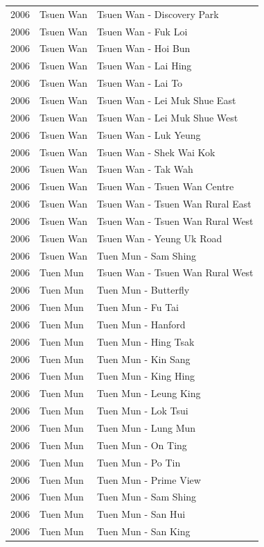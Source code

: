 \begin{longtable}{p{1.2cm}p{3cm}p{7cm}}
2006 & Tsuen Wan & Tsuen Wan - Discovery Park \\
2006 & Tsuen Wan & Tsuen Wan - Fuk Loi \\
2006 & Tsuen Wan & Tsuen Wan - Hoi Bun \\
2006 & Tsuen Wan & Tsuen Wan - Lai Hing \\
2006 & Tsuen Wan & Tsuen Wan - Lai To \\
2006 & Tsuen Wan & Tsuen Wan - Lei Muk Shue East \\
2006 & Tsuen Wan & Tsuen Wan - Lei Muk Shue West \\
2006 & Tsuen Wan & Tsuen Wan - Luk Yeung \\
2006 & Tsuen Wan & Tsuen Wan - Shek Wai Kok \\
2006 & Tsuen Wan & Tsuen Wan - Tak Wah \\
2006 & Tsuen Wan & Tsuen Wan - Tsuen Wan Centre \\
2006 & Tsuen Wan & Tsuen Wan - Tsuen Wan Rural East \\
2006 & Tsuen Wan & Tsuen Wan - Tsuen Wan Rural West \\
2006 & Tsuen Wan & Tsuen Wan - Yeung Uk Road \\
2006 & Tsuen Wan & Tuen Mun - Sam Shing \\
2006 & Tuen Mun & Tsuen Wan - Tsuen Wan Rural West \\
2006 & Tuen Mun & Tuen Mun - Butterfly \\
2006 & Tuen Mun & Tuen Mun - Fu Tai \\
2006 & Tuen Mun & Tuen Mun - Hanford \\
2006 & Tuen Mun & Tuen Mun - Hing Tsak \\
2006 & Tuen Mun & Tuen Mun - Kin Sang \\
2006 & Tuen Mun & Tuen Mun - King Hing \\
2006 & Tuen Mun & Tuen Mun - Leung King \\
2006 & Tuen Mun & Tuen Mun - Lok Tsui \\
2006 & Tuen Mun & Tuen Mun - Lung Mun \\
2006 & Tuen Mun & Tuen Mun - On Ting \\
2006 & Tuen Mun & Tuen Mun - Po Tin \\
2006 & Tuen Mun & Tuen Mun - Prime View \\
2006 & Tuen Mun & Tuen Mun - Sam Shing \\
2006 & Tuen Mun & Tuen Mun - San Hui \\
2006 & Tuen Mun & Tuen Mun - San King \\

\end{longtable}
